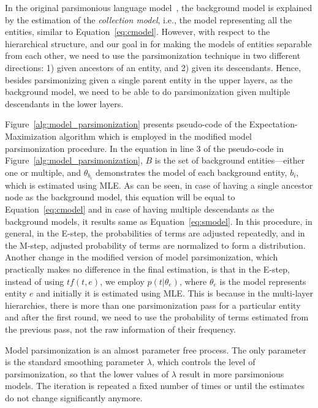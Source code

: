 In the original parsimonious language model~\citep{Hiemstra:2004}, the background model is explained by the estimation of the \emph{collection model}, i.e., the model representing all the entities, similar to Equation~\ref{eq:cmodel}.  
However, with respect to the hierarchical structure, and our goal in \achswlm for making the models of entities separable from each other, we need to use the parsimonization technique in two different directions: 1) given ancestors of an entity, and 2) given its descendants. Hence, besides parsimonizing given a single parent entity in the upper layers, as the background model, we need to be able to do parsimonization given multiple descendants in the lower layers. 

Figure~\ref{alg:model_parsimonization} presents pseudo-code of the Expectation-Maximization algorithm which is employed in the modified model parsimonization procedure. 
In the equation in line 3 of the pseudo-code in Figure~\ref{alg:model_parsimonization}, $B$ is the set of background entities\:---\:either one or multiple, and $\theta_{b_i}$ demonstrates the model of each background entity, $b_i$, which is estimated using MLE. As can be seen, in case of having a single ancestor node as the background model,  this equation will be equal to Equation~\ref{eq:cmodel} and in case of having multiple descendants as the background models, it results same as Equation~\ref{eq:smodel}. 
In this procedure, in general, in the E-step, the probabilities of terms are adjusted repeatedly, and in the M-step, adjusted probability of terms are normalized to form a distribution. 
Another change in the modified version of model parsimonization, which practically makes no difference in the final estimation, is that in the E-step, instead of using $tf(t,e)$, we employ $p(t|\theta_e)$, where $\theta_e$ is the model represents entity $e$ and initially it is estimated using MLE. This is because in the multi-layer hierarchies, there is more than one parsimonization pass for a particular entity and after the first round, we need to use the probability of terms estimated from the previous pass, not the raw information of their frequency.


Model parsimonization is an almost parameter free process. The only parameter is the standard smoothing parameter $\lambda$, which controls the level of parsimonization, so that the lower values of $\lambda$ result in more parsimonious models.
The iteration is repeated a fixed number of times or until the estimates do not change significantly anymore. 

